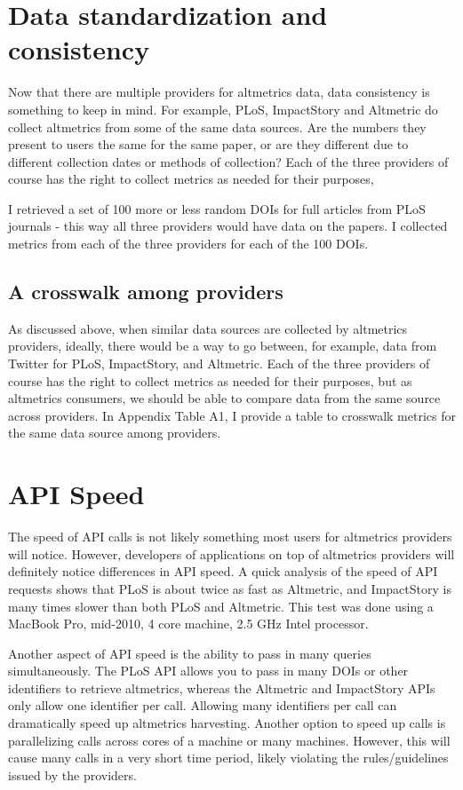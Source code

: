 \documentclass[letterpaper,superscriptaddress,showkeys,longbibliography]{revtex4-1}\usepackage{graphicx, color}
\begin{document}
\section{Data standardization and consistency}

Now that there are multiple providers for altmetrics data, data consistency is something to keep in mind. For example, PLoS, ImpactStory and Altmetric do collect altmetrics from some of the same data sources. Are the numbers they present to users the same for the same paper, or are they different due to different collection dates or methods of collection? Each of the three providers of course has the right to collect metrics as needed for their purposes, 

I retrieved a set of 100 more or less random DOIs for full articles from PLoS journals - this way all three providers would have data on the papers. I collected metrics from each of the three providers for each of the 100 DOIs. 

\subsection*{A crosswalk among providers}

As discussed above, when similar data sources are collected by altmetrics providers, ideally, there would be a way to go between, for example, data from Twitter for PLoS, ImpactStory, and Altmetric. Each of the three providers of course has the right to collect metrics as needed for their purposes, but as altmetrics consumers, we should be able to compare data from the same source across providers. In Appendix Table A1, I provide a table to crosswalk metrics for the same data source among providers.

\section{API Speed}

The speed of API calls is not likely something most users for altmetrics providers will notice. However, developers of applications on top of altmetrics providers will definitely notice differences in API speed. A quick analysis of the speed of API requests shows that PLoS is about twice as fast as Altmetric, and ImpactStory is many times slower than both PLoS and Altmetric. This test was done using a MacBook Pro, mid-2010, 4 core machine, 2.5 GHz Intel processor. 

Another aspect of API speed is the ability to pass in many queries simultaneously. The PLoS API allows you to pass in many DOIs or other identifiers to retrieve altmetrics, whereas the Altmetric and ImpactStory APIs only allow one identifier per call. Allowing many identifiers per call can dramatically speed up altmetrics harvesting. Another option to speed up calls is parallelizing calls across cores of a machine or many machines.  However, this will cause many calls in a very short time period, likely violating the rules/guidelines issued by the providers.
\end{document}
